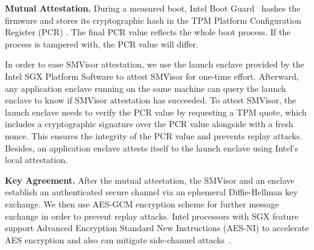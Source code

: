 \textbf{Mutual Attestation.}
During a measured boot, Intel Boot Guard~\cite{ruan_platform_2014} hashes the firmware and stores its cryptographic hash in the TPM Platform Configuration Register (PCR) \cite{tcg_trusted_2014}. The final PCR value reflects the whole boot process. If the process is tampered with, the PCR value will differ.

In order to ease SMVisor attestation, we use the launch enclave provided by the Intel SGX Platform Software to attest SMVisor for one-time effort. Afterward, any application enclave running on the same machine can query the launch enclave to know if SMVisor attestation has succeeded. To attest  SMVisor, the launch enclave needs to verify the PCR value by requesting a TPM quote, which includes a cryptographic signature over the PCR value alongside with a fresh nonce. This ensures the integrity of the PCR value and prevents replay attacks. Besides, an application enclave attests itself to the launch enclave using Intel's local attestation.

\textbf{Key Agreement.}
After the mutual attestation, the SMVisor and an enclave establish an authenticated secure channel via an ephemeral Diffie-Hellman key exchange. We then use AES-GCM encryption scheme for further message exchange in order to prevent replay attacks. Intel processors with SGX feature support Advanced Encryption Standard New Instructions (AES-NI) to accelerate AES encryption and also can mitigate side-channel attacks~\cite{Corporation2016Intel}.



